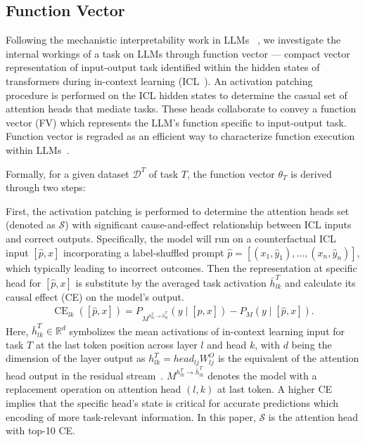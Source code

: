 \subsection{Function Vector}

Following the mechanistic interpretability work in LLMs ~\citep{todd2023function, hendel2023context}, we investigate the internal workings of a task on LLMs through function vector — compact vector representation of input-output task identified within the hidden states of transformers during in-context learning (ICL~\citep{brown2020language}). 
An activation patching~\citep{meng2022locating, meng2023massediting, wang2023interpretability} procedure is performed on the ICL hidden states to determine the casual set of attention heads that mediate tasks. These heads collaborate to convey a function vector (FV) which represents the LLM's function specific to input-output task. Function vector is regraded as an efficient way to characterize function execution within LLMs~\citep{todd2023function}.


Formally, for a given dataset $\mathcal{D}^{T}$ of task $T$, the function vector $\theta_T$ is derived through two steps:

First, the activation patching is performed to determine the attention heads set (denoted as $\mathcal{S}$)  with significant cause-and-effect relationship between ICL inputs and correct outputs. Specifically, the model will run on a counterfactual ICL input $[\hat{p},x]$ incorporating a label-shuffled prompt $\hat{p}=[(x_1, \hat{y}_1), ..., (x_n, \hat{y}_n)]$, which typically leading to incorrect outcomes. Then the representation at specific head for $[\hat{p},x]$ is substitute by the averaged task activation $\bar{h}_{lk}^T$ and calculate its causal effect (CE) on the model's output. 
\begin{equation}
\begin{aligned}
\operatorname{CE}_{lk}([\hat{p},x])=P_{M^{h^T_{lk}\rightarrow \bar{h}_{lk}^T}}(y \mid [\hat{p},x] )  -P_M(y \mid [\hat{p},x]).
\end{aligned}
\end{equation}
Here, $\bar{h}_{lk}^T \in \mathbb{R}^d$ symbolizes the mean activations of in-context learning input for task $T$ at the last token position across layer $l$ and head $k$, with 
$d$ being the dimension of the layer output as $h_{lk}^T = head_{lj}W^O_{lj}$ is the equivalent of the attention head output in the residual stream~\citep{elhage2021mathematical}. $M^{h^T_{lk}\rightarrow \bar{h}_{lk}^T}$ denotes the model with a replacement operation on attention head $(l,k)$ at last token. A higher CE implies that the specific head's state is critical for accurate predictions which encoding of more task-relevant information. In this paper, $\mathcal{S}$ is the attention head with top-10 CE.


